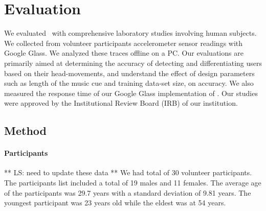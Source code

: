 \section{Evaluation}\label{sec:results}

We evaluated \systemname~with comprehensive laboratory studies involving 
human subjects. We collected from volunteer participants accelerometer sensor 
readings with Google Glass.
We analyzed these traces offline on a PC.
Our evaluations are primarily aimed at determining the accuracy of detecting 
and differentiating users based on their head-movements, and understand 
the effect of design parameters such as length of the music cue and training 
data-set size, on accuracy. We also measured the response time of our Google 
Glass implementation of \systemname.
Our studies were approved by the Institutional Review Board (IRB) of our 
institution.


\subsection{Method}


\paragraph{Participants}
** LS: need to update these data **
We had total of 30 volunteer participants. The participants list included a total of 19 males and 11 females. 
The average age of the participants was 29.7 years with a standard deviation 
of 9.81 years. The youngest participant was 23 years old while the eldest was 
at 54 years.


